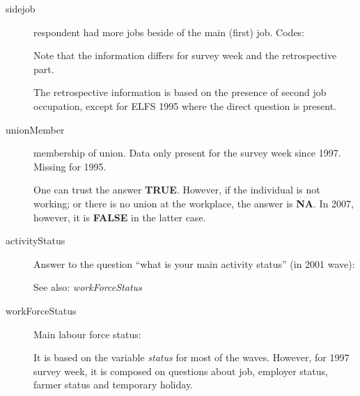 \documentclass[a4paper]{article}
\newcommand{\FALSE}{\textbf{FALSE}\xspace}
\newcommand{\NA}{\textbf{NA}\xspace}
\newcommand{\TRUE}{\textbf{TRUE}\xspace}
\begin{document}
\begin{description}
\item[sidejob] respondent had more jobs beside of the main (first)
  job.  Codes:
  Note that the information differs for survey week and the
  retrospective part.

  The retrospective information is based on the presence of second job
  occupation, except for ELFS 1995 where the direct question is present.
\item[unionMember] membership of union.  Data only present for the
  survey week since 1997.  Missing for 1995.  

  One can trust the answer \TRUE.  However, if the individual is
  not working; or there is no union at the workplace, the answer is
  \NA.  In 2007, however, it is \FALSE in the latter case.
\item[activityStatus] Answer to the question ``what is your main
  activity status'' (in 2001 wave):
  See also: \emph{workForceStatus}
\item[workForceStatus] Main labour force status:
  It is based on the variable \emph{status} for most of the waves.
  However, for 1997 survey week, it is composed on questions about
  job, employer status, farmer status and temporary holiday.


\end{description}
\end{document}

